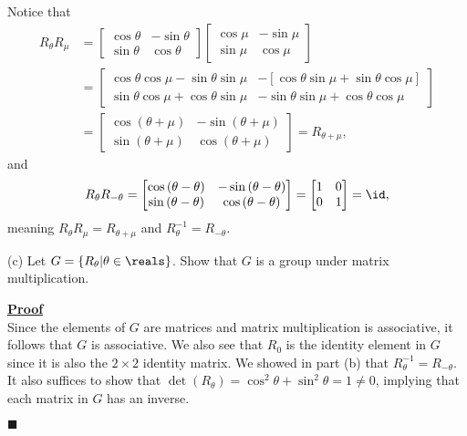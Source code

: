 \documentclass[12pt,a4paper]{article}
\newenvironment{proof}
{
\textbf{\underline{Proof}} \\
}
{
\begin{flushright}
$\blacksquare$
\end{flushright}}
\begin{document}
Notice that 
\begin{align*}
R_{\theta}R_{\mu} &= \begin{bmatrix}
\cos{\theta} & -\sin{\theta} \\
\sin{\theta} & \cos{\theta}
\end{bmatrix}
\begin{bmatrix}
\cos{\mu} & -\sin{\mu} \\
\sin{\mu} & \cos{\mu}
\end{bmatrix} 
\\
&= 
\begin{bmatrix}
\cos{\theta}\cos{\mu} - \sin{\theta}\sin{\mu} & 
-[\cos{\theta}\sin{\mu} + \sin{\theta}\cos{\mu}] \\
\sin{\theta}\cos{\mu} + \cos{\theta}\sin{\mu} &
-\sin{\theta}\sin{\mu} + \cos{\theta}\cos{\mu}
\end{bmatrix}
\\
&= \begin{bmatrix}
\cos{(\theta + \mu)} & -\sin{(\theta + \mu)} \\
\sin{(\theta + \mu)} & \cos{(\theta + \mu)}
\end{bmatrix}
= R_{\theta + \mu},
\end{align*}
and
\begin{align*}
R_{\theta}R_{-\theta} = \begin{bmatrix}
\cos{(\theta - \theta)} & -\sin{(\theta - \theta)} \\
\sin{(\theta - \theta)} & \cos{(\theta - \theta)}
\end{bmatrix}
=
\begin{bmatrix}
1 & 0 \\
0 & 1
\end{bmatrix}
= \id,
\end{align*}
meaning $R_{\theta}R_{\mu} = R_{\theta + \mu}$ and $R_{\theta}^{-1} = R_{-\theta}$.

(c) Let $G = \{R_{\theta}|\theta\in\reals\}$. Show that $G$ is a group under matrix multiplication.

\begin{proof}
Since the elements of $G$ are matrices and matrix multiplication is associative, it follows that $G$ is associative. We also see that $R_{0}$ is the identity element in $G$ since it is also the $2 \times 2$ identity matrix. We showed in part (b) that $R_{\theta}^{-1} = R_{-\theta}$. It also suffices to show that $\det(R_{\theta}) = \cos^2{\theta} + \sin^2{\theta} = 1 \not= 0$, implying that each matrix in $G$ has an inverse. 
\end{proof}
\end{document}
